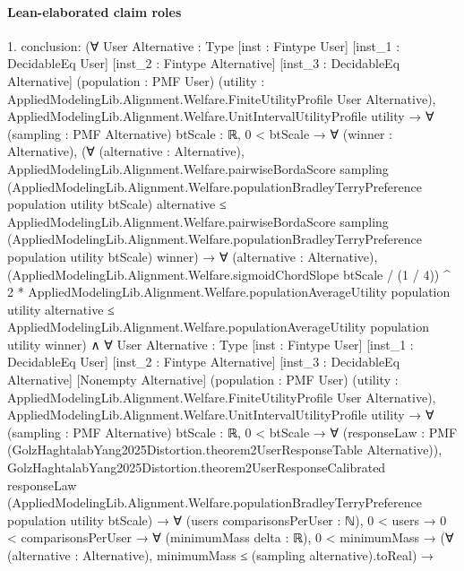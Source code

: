 \documentclass[10pt]{article}
\begin{document}
\paragraph{Lean-elaborated claim roles}\begin{ReviewVerbatim}
1. conclusion: (∀ {User Alternative : Type} [inst : Fintype User] [inst_1 : DecidableEq User] [inst_2 : Fintype Alternative]
    [inst_3 : DecidableEq Alternative] (population : PMF User)
    (utility : AppliedModelingLib.Alignment.Welfare.FiniteUtilityProfile User Alternative),
    AppliedModelingLib.Alignment.Welfare.UnitIntervalUtilityProfile utility →
      ∀ (sampling : PMF Alternative) {btScale : ℝ},
        0 < btScale →
          ∀ (winner : Alternative),
            (∀ (alternative : Alternative),
                AppliedModelingLib.Alignment.Welfare.pairwiseBordaScore sampling
                    (AppliedModelingLib.Alignment.Welfare.populationBradleyTerryPreference population utility btScale)
                    alternative ≤
                  AppliedModelingLib.Alignment.Welfare.pairwiseBordaScore sampling
                    (AppliedModelingLib.Alignment.Welfare.populationBradleyTerryPreference population utility btScale)
                    winner) →
              ∀ (alternative : Alternative),
                (AppliedModelingLib.Alignment.Welfare.sigmoidChordSlope btScale / (1 / 4)) ^ 2 *
                    AppliedModelingLib.Alignment.Welfare.populationAverageUtility population utility alternative ≤
                  AppliedModelingLib.Alignment.Welfare.populationAverageUtility population utility winner) ∧
  ∀ {User Alternative : Type} [inst : Fintype User] [inst_1 : DecidableEq User] [inst_2 : Fintype Alternative]
    [inst_3 : DecidableEq Alternative] [Nonempty Alternative] (population : PMF User)
    (utility : AppliedModelingLib.Alignment.Welfare.FiniteUtilityProfile User Alternative),
    AppliedModelingLib.Alignment.Welfare.UnitIntervalUtilityProfile utility →
      ∀ (sampling : PMF Alternative) {btScale : ℝ},
        0 < btScale →
          ∀ (responseLaw : PMF (GolzHaghtalabYang2025Distortion.theorem2UserResponseTable Alternative)),
            GolzHaghtalabYang2025Distortion.theorem2UserResponseCalibrated responseLaw
                (AppliedModelingLib.Alignment.Welfare.populationBradleyTerryPreference population utility btScale) →
              ∀ (users comparisonsPerUser : ℕ),
                0 < users →
                  0 < comparisonsPerUser →
                    ∀ (minimumMass delta : ℝ),
                      0 < minimumMass →
                        (∀ (alternative : Alternative), minimumMass ≤ (sampling alternative).toReal) →

\end{ReviewVerbatim}
\end{document}
